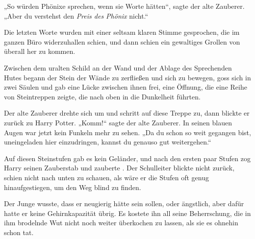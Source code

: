 „So würden Phönixe sprechen, wenn sie Worte hätten“, sagte der alte Zauberer.
„Aber du verstehst den \emph{Preis des Phönix} nicht.“

Die letzten Worte wurden mit einer seltsam klaren Stimme gesprochen, die im ganzen Büro widerzuhallen schien, und dann schien ein gewaltiges Grollen von überall her zu kommen.

Zwischen dem uralten Schild an der Wand und der Ablage des Sprechenden Hutes begann der Stein der Wände zu zerfließen und sich zu bewegen, goss sich in zwei Säulen und gab eine Lücke zwischen ihnen frei, eine Öffnung, die eine Reihe von Steintreppen zeigte, die nach oben in die Dunkelheit führten.

Der alte Zauberer drehte sich um und schritt auf diese Treppe zu, dann blickte er zurück zu Harry Potter.
„Komm!“ sagte der alte Zauberer. In seinen blauen Augen war jetzt kein Funkeln mehr zu sehen.
„Da du schon so weit gegangen bist, uneingeladen hier einzudringen, kannst du genauso gut weitergehen.“

\later

Auf diesen Steinstufen gab es kein Geländer, und nach den ersten paar Stufen zog Harry seinen Zauberstab und zauberte . Der Schulleiter blickte nicht zurück, schien nicht nach unten zu schauen, als wäre er die Stufen oft genug hinaufgestiegen, um den Weg blind zu finden.

Der Junge wusste, dass er neugierig hätte sein sollen, oder ängstlich, aber dafür hatte er keine Gehirnkapazität übrig. Es kostete ihn all seine Beherrschung, die in ihm brodelnde Wut nicht noch weiter überkochen zu lassen, als sie es ohnehin schon tat.

